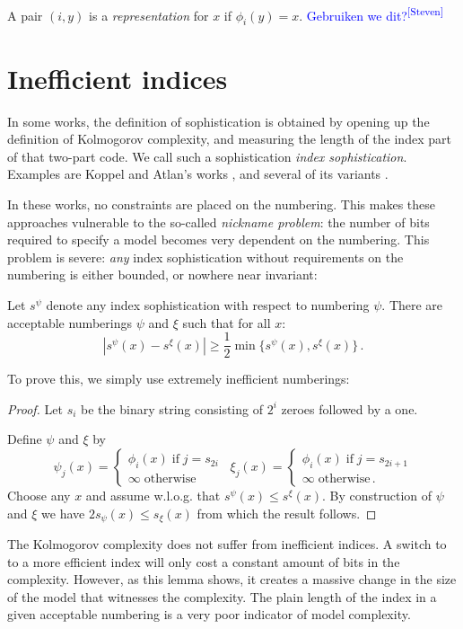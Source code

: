 \documentclass{style/llncs}
\newcommand{\p}{\,\text{.}}
\newcommand{\sdr}[1]{\textcolor{blue}{\small #1\textsuperscript{[Steven]} }}
\begin{document}
A pair $(i,y)$ is a \emph{representation} for $x$ if $\phi_i(y)=x$. \sdr{Gebruiken we dit?}

\section{Inefficient indices}
\label{section:indices}
In some works, the definition of sophistication is obtained by opening up the definition of Kolmogorov complexity, and measuring the length of the index part of that two-part code. We call such a sophistication \emph{index sophistication}. Examples are Koppel and Atlan's works \cite{koppelSoph1988,koppel1991almost},  and several of its variants \cite{antunes2009sophistication,antunes2013sophistication}. 

In these works, no constraints are placed on the numbering. This makes these approaches vulnerable to the so-called \emph{nickname problem}: the number of bits required to specify a model becomes very dependent on the numbering. This problem is severe: \emph{any} index sophistication without requirements on the numbering is either bounded, or nowhere near invariant:

\begin{lemma}
Let $s^\psi$ denote any index sophistication with respect to numbering $\psi$.
There are acceptable numberings $\psi$ and $\xi$ such that for all $x$:
\[|s^\psi(x) - s^\xi(x)|\geq \frac{1}{2}\min\{s^\psi(x),s^\xi(x)\}\p\]
\end{lemma}

To prove this, we simply use extremely inefficient numberings:

\begin{proof}
Let $s_i$ be the binary string consisting of $2^{i}$ zeroes followed by a one.

Define $\psi$ and $\xi$ by
\[
\psi_j(x) = \begin{cases}
	\phi_i(x) \;\text{if}\; j = s_{2i}\\
	\infty\;\text{otherwise}
\end{cases}\,\,\,
\xi_j(x) = 
\begin{cases}
	\phi_i(x) \;\text{if}\; j = s_{2i+1} \\
	\infty \;\text{otherwise}\p
\end{cases}
\]
Choose any $x$ and assume w.l.o.g. that $s^\psi(x)\le s^\xi(x)$. By construction of $\psi$ and $\xi$ we have $2s_\psi(x)  \leq s_\xi(x)$ from which the result follows.
\end{proof}
The Kolmogorov complexity does not suffer from inefficient indices. A switch to to a more efficient index will only cost a constant amount of bits in the complexity. However, as this lemma shows, it creates a massive change in the size of the model that witnesses the complexity. The plain length of the index in a given acceptable numbering is a very poor indicator of model complexity.
\end{document}
